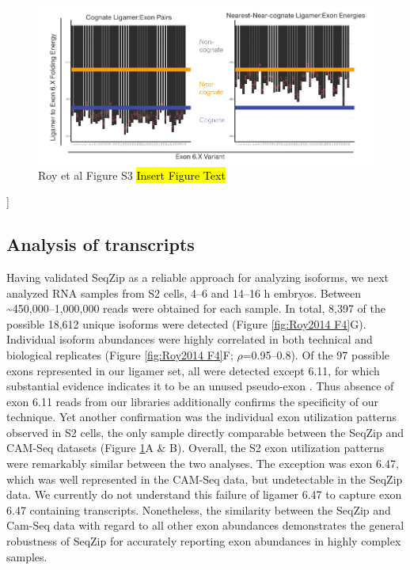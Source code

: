 {		\begin{figure}[htbp] %
			\centering 
			\includegraphics{Figures/SeqZipPaper/Roy2014FigS3.eps}
			\caption[Roy et al Supplemental Figure 3]
			{
				Roy et al Figure S3
				\hl{Insert Figure Text}
				}
			\label{fig:Roy2014 FS3}
			\end{figure}]

	\subsection{Analysis of \dscam{} transcripts}
	
		Having validated SeqZip as a reliable approach for analyzing \dscam{} isoforms, we next analyzed RNA samples from S2 cells, 4–6 and 14–16 h embryos. Between \textasciitilde 450,000–1,000,000 reads were obtained for each sample. In total, 8,397 of the possible 18,612 unique isoforms were detected (Figure \ref{fig:Roy2014 F4}G). Individual isoform abundances were highly correlated in both technical and biological replicates (Figure \ref{fig:Roy2014 F4}F; $\rho$=0.95–0.8). Of the 97 possible exons represented in our ligamer set, all were detected except 6.11, for which substantial evidence indicates it to be an unused pseudo-exon \citep{Neves2004,Zhan2004,Watson2005,Sun2013}. Thus absence of exon 6.11 reads from our libraries additionally confirms the specificity of our technique. Yet another confirmation was the individual exon utilization patterns observed in S2 cells, the only sample directly comparable between the SeqZip and CAM-Seq datasets (Figure \ref{fig:Roy2014 FS3}A \& B). Overall, the S2 exon utilization patterns were remarkably similar between the two analyses. The exception was exon 6.47, which was well represented in the CAM-Seq data, but undetectable in the SeqZip data. We currently do not understand this failure of ligamer 6.47 to capture exon 6.47 containing transcripts. Nonetheless, the similarity between the SeqZip and Cam-Seq data with regard to all other exon abundances demonstrates the general robustness of SeqZip for accurately reporting exon abundances in highly complex samples.

}
